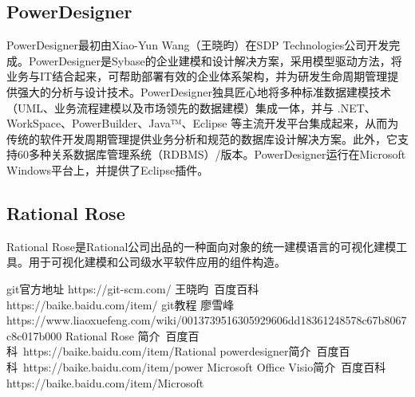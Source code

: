\documentclass{article}
\begin{document}
	\subsection{PowerDesigner}
	PowerDesigner最初由Xiao-Yun Wang（王晓昀）在SDP Technologies公司开发完成。PowerDesigner是Sybase的企业建模和设计解决方案，采用模型驱动方法，将业务与IT结合起来，可帮助部署有效的企业体系架构，并为研发生命周期管理提供强大的分析与设计技术。PowerDesigner独具匠心地将多种标准数据建模技术（UML、业务流程建模以及市场领先的数据建模）集成一体，并与 .NET、WorkSpace、PowerBuilder、Java™、Eclipse 等主流开发平台集成起来，从而为传统的软件开发周期管理提供业务分析和规范的数据库设计解决方案。此外，它支持60多种关系数据库管理系统（RDBMS）/版本。PowerDesigner运行在Microsoft Windows平台上，并提供了Eclipse插件。
	\subsection{Rational Rose}
	Rational Rose是Rational公司出品的一种面向对象的统一建模语言的可视化建模工具。用于可视化建模和公司级水平软件应用的组件构造。
	\begin{thebibliography}{99}
		\bibitem{}git官方地址 https://git-scm.com/
		\bibitem{}王晓昀\ 百度百科 https://baike.baidu.com/item/%
		\bibitem{}git教程 廖雪峰
		\\ https://www.liaoxuefeng.com/wiki/0013739516305929606dd18361248578c67b8067c8c017b000
		\bibitem{}Rational Rose 简介\ 百度百科\ https://baike.baidu.com/item/Rational%
		\bibitem{}powerdesigner简介\ 百度百科\ https://baike.baidu.com/item/power%
		\bibitem{}Microsoft Office Visio简介\ 百度百科 \\ https://baike.baidu.com/item/Microsoft%
		
	\end{thebibliography}
\end{document}
